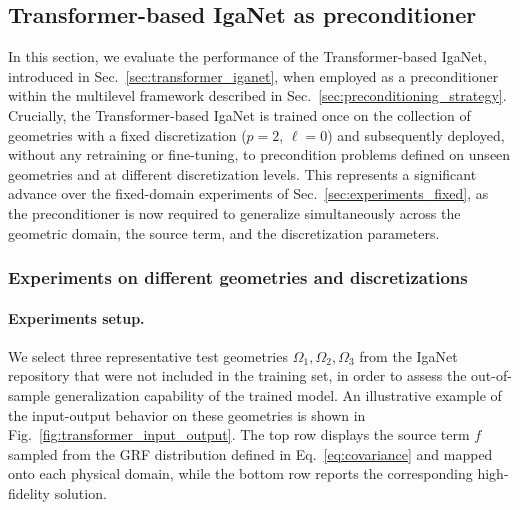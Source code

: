 \documentclass{article}
\newcommand{\reflevel}{\ell} %
\theoremstyle{plain}
\numberwithin{equation}{section}
\begin{document}
\subsection{Transformer-based IgaNet as preconditioner}\label{sec:transformer_preconditioner}
In this section, we evaluate the performance of the Transformer-based IgaNet, introduced in Sec.~\ref{sec:transformer_iganet}, when employed as a preconditioner within the multilevel framework described in Sec.~\ref{sec:preconditioning_strategy}. Crucially, the Transformer-based IgaNet is trained once on the collection of geometries with a fixed discretization ($p=2$, $\reflevel=0$) and subsequently deployed, without any retraining or fine-tuning, to precondition problems defined on unseen geometries and at different discretization levels. This represents a significant advance over the fixed-domain experiments of Sec.~\ref{sec:experiments_fixed}, as the preconditioner is now required to generalize simultaneously across the geometric domain, the source term, and the discretization parameters.

\subsubsection{Experiments on different geometries and discretizations}\label{sec:transformer_experiments}
\paragraph{Experiments setup.} We select three representative test geometries $\Omega_1, \Omega_2, \Omega_3$ from the IgaNet repository that were not included in the training set, in order to assess the out-of-sample generalization capability of the trained model. An illustrative example of the input-output behavior on these geometries is shown in Fig.~\ref{fig:transformer_input_output}. The top row displays the source term $f$ sampled from the GRF distribution defined in Eq.~\eqref{eq:covariance} and mapped onto each physical domain, while the bottom row reports the corresponding high-fidelity solution.
\end{document}
